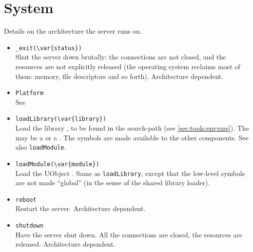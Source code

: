 \section{System}
Details on the architecture the \urbi server runs on.

\begin{itemize}
\item \lstinline'_exit(\var{status})'\\
  Shut the server down brutally: the connections are not closed, and
  the resources are not explicitly released (the operating system
  reclaims most of them: memory, file descriptors and so forth).
  Architecture dependent.

\item \lstinline'Platform'\\
  See 

\item \lstinline'loadLibrary(\var{library})'\\
  Load the library , to be found in the
   search-path (see
  \autoref{sec:tools:envvars}).  The  may be a
   or a .  The \Cxx symbols are made
  available to the other \Cxx components.  See also
  \lstinline|loadModule|.

\item \lstinline'loadModule(\var{module})'\\
  Load the UObject .  Same as \lstinline|loadLibrary|,
  except that the low-level \Cxx symbols are not made ``global'' (in
  the sense of the shared library loader).

\item \lstinline'reboot'\\
  Restart the \urbi server.  Architecture dependent.

\item \lstinline'shutdown'\\
  Have the \urbi server shut down.  All the connections are closed,
  the resources are released.  Architecture dependent.
\end{itemize}

